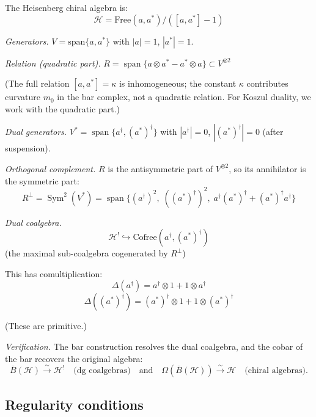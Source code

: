 \begin{example}\label{ex:heisenberg-quadratic-dual}
The Heisenberg chiral algebra is:
\[\mathcal{H} = \text{Free}(a, a^*) / ([a, a^*] - 1)\]

\emph{Generators.} $V = \text{span}\{a, a^*\}$ with $|a| = 1$, $|a^*| = 1$.

\emph{Relation (quadratic part).} $R = \operatorname{span}\{a \otimes a^* - a^* \otimes a\} \subset V^{\otimes 2}$

(The full relation $[a, a^*] = \kappa$ is inhomogeneous; the constant $\kappa$
contributes curvature $m_0$ in the bar complex, not a quadratic relation.
For Koszul duality, we work with the quadratic part.)

\emph{Dual generators.} $V^* = \operatorname{span}\{a^{\dagger}, (a^*)^{\dagger}\}$ with
$|a^{\dagger}| = 0$, $|(a^*)^{\dagger}| = 0$ (after suspension).

\emph{Orthogonal complement.} $R$ is the antisymmetric part of $V^{\otimes 2}$,
so its annihilator is the symmetric part:
\[R^\perp = \operatorname{Sym}^2(V^*) = \operatorname{span}\{(a^{\dagger})^2,\;
((a^*)^{\dagger})^2,\; a^{\dagger}(a^*)^{\dagger} + (a^*)^{\dagger}a^{\dagger}\}\]

\emph{Dual coalgebra.}
\[\mathcal{H}^! \hookrightarrow \text{Cofree}(a^{\dagger}, (a^*)^{\dagger})\]
(the maximal sub-coalgebra cogenerated by $R^\perp$)

This has comultiplication:
\[\Delta(a^{\dagger}) = a^{\dagger} \otimes 1 + 1 \otimes a^{\dagger}\]
\[\Delta((a^*)^{\dagger}) = (a^*)^{\dagger} \otimes 1 + 1 \otimes (a^*)^{\dagger}\]

(These are primitive.)

\emph{Verification.} The bar construction resolves the dual coalgebra,
and the cobar of the bar recovers the original algebra:
\[\bar{B}(\mathcal{H}) \xrightarrow{\sim} \mathcal{H}^!
\quad \text{(dg coalgebras)} \quad \text{and} \quad
\Omega(\bar{B}(\mathcal{H})) \xrightarrow{\sim} \mathcal{H}
\quad \text{(chiral algebras)}.\]
\end{example}

\subsection{Regularity conditions}

